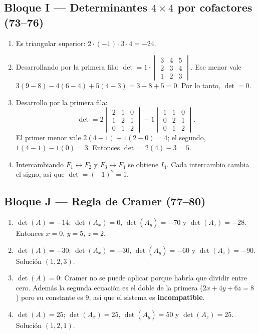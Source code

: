 \documentclass[12pt, letterpaper]{article}
\newcommand{\mwdet}[1]{\ensuremath{\begin{vmatrix}#1\end{vmatrix}}}
\begin{document}
\subsection*{Bloque I — Determinantes $4\times4$ por cofactores (73--76)}
\begin{enumerate}[label=\textbf{\arabic*.}, start=73, leftmargin=*]
  \item Es triangular superior: $2\cdot(-1)\cdot3\cdot4=-24$.
  \item Desarrollando por la primera fila:
        $\det=1\cdot\mwdet{3&4&5\\2&3&4\\1&2&3}$.
        Ese menor vale $3(9-8)-4(6-4)+5(4-3)=3-8+5=0$.
        Por lo tanto, $\det=0$.
  \item Desarrollo por la primera fila:
        \[
          \det=2\mwdet{2&1&0\\1&2&1\\0&1&2}
               -1\mwdet{1&1&0\\0&2&1\\0&1&2}.
        \]
        El primer menor vale $2(4-1)-1(2-0)=4$; el segundo,
        $1(4-1)-1(0)=3$. Entonces
        $\det=2(4)-3=5$.
  \item Intercambiando $F_1\leftrightarrow F_2$ y $F_3\leftrightarrow F_4$
        se obtiene $I_4$. Cada intercambio cambia el signo, así que
        $\det=(-1)^2=1$.
\end{enumerate}

\subsection*{Bloque J — Regla de Cramer (77--80)}
\begin{enumerate}[label=\textbf{\arabic*.}, start=77, leftmargin=*]
  \item $\det(A)=-14$; $\det(A_x)=0$, $\det(A_y)=-70$ y
        $\det(A_z)=-28$. Entonces $x=0$, $y=5$, $z=2$.
  \item $\det(A)=-30$; $\det(A_x)=-30$, $\det(A_y)=-60$ y
        $\det(A_z)=-90$. Solución $(1,2,3)$.
  \item $\det(A)=0$: Cramer no se puede aplicar porque habría que dividir
        entre cero. Además la segunda ecuación es el doble de la primera
        ($2x+4y+6z=8$) pero su constante es $9$, así que el sistema es
        \textbf{incompatible}.
  \item $\det(A)=25$; $\det(A_x)=25$, $\det(A_y)=50$ y $\det(A_z)=25$.
        Solución $(1,2,1)$.
\end{enumerate}
\end{document}
